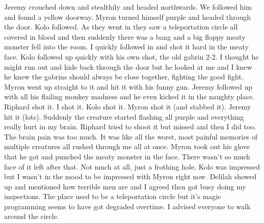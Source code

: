 Jeremy crouched down and stealthily and headed northwards. We followed him and found a yellow doorway. Myron turned himself purple and headed through the door. Kolo followed. As they went in they saw a teleportation circle all covered in blood and then suddenly there was a bang and a big floppy meaty monster fell into the room. I quickly followed in and shot it hard in the meaty face. Kolo followed up quickly with his own shot, the old gabrin 2-2. I thought he might run out and hide back through the door but he looked at me and I knew he knew the gabrins should always be close together, fighting the good fight. Myron went up straight to it and hit it with his funny gun. Jeremy followed up with all his flailing monkey madness and he even kicked it in the naughty place. Riphard shot it. I shot it. Kolo shot it. Myron shot it (and stabbed it). Jeremy hit it (lots). Suddenly the creature started flashing all purple and everything really hurt in my brain. Riphard tried to shoot it but missed and then I did too. The brain pain was too much. It was like all the worst, most painful memories of multiple creatures all rushed through me all at once. Myron took out his glove that he got and punched the meaty monster in the face. There wasn’t so much face of it left after that. Not much at all, just a frothing hole. Kolo was impressed but I wasn’t in the mood to be impressed with Myron right now. Delilah showed up and mentioned how terrible men are and I agreed then got busy doing my inspections. The place used to be a teleportation circle but it’s magic programming seems to have got degraded overtime. I advised everyone to walk around the circle.\medskip

